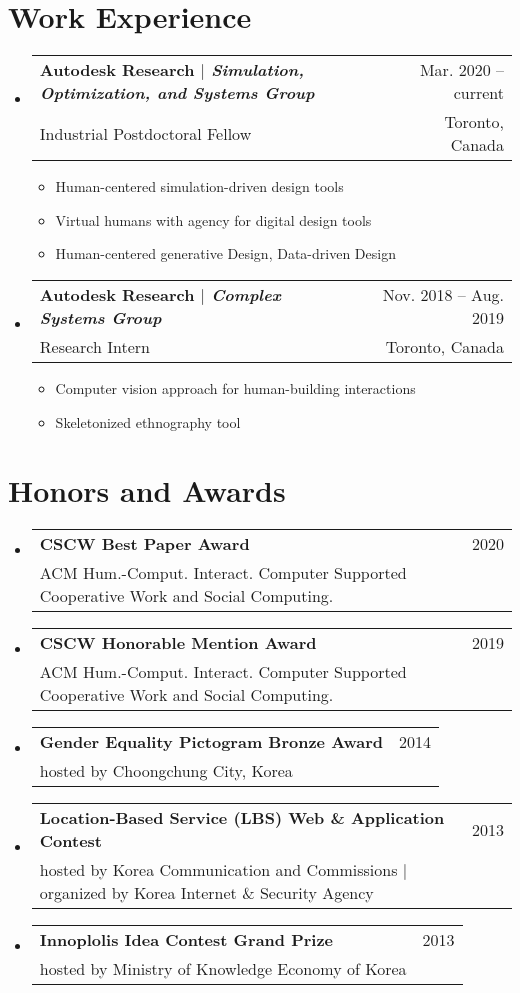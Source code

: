\documentclass[letterpaper,11pt]{article} %
\makeatletter
\newcommand{\CVItem}[1]{
  \item\small{
    {#1 \vspace{-2pt}}
  }
}
\newcommand{\CVSubheading}[4]{
  \vspace{-2pt}\item
    \begin{tabular*}{0.97\textwidth}[t]{l@{\extracolsep{\fill}}r}
      \textbf{#1} & #2 \\
      \small#3 & \small #4 \\
    \end{tabular*}\vspace{-7pt}
}
\newcommand{\CVSubHeadingListStart}{\begin{itemize}[leftmargin=0.5cm, label={}]}
\newcommand{\CVSubHeadingListEnd}{\end{itemize}}
\newcommand{\CVItemListStart}{\begin{itemize}}
\newcommand{\CVItemListEnd}{\end{itemize}\vspace{-5pt}}
\makeatother
\begin{document}
\begin{comment}
try to briefly explain what you did and why it is relevant to the position you are seeking
\end{comment}

\section{Work Experience}
  \CVSubHeadingListStart
    \CVSubheading
      {Autodesk Research $|$ \emph{\small{Simulation, Optimization, and Systems Group}}}{Mar. 2020 -- current}
      {Industrial Postdoctoral Fellow}{Toronto, Canada}
      \CVItemListStart
        \CVItem{Human-centered simulation-driven design tools}
        \CVItem{Virtual humans with agency for digital design tools}
        \CVItem{Human-centered generative Design, Data-driven Design}
        
    \CVItemListEnd
    
    \CVSubheading
      {Autodesk Research $|$ \emph{\small{Complex Systems Group}}}{Nov. 2018 -- Aug. 2019}
      {Research Intern}{Toronto, Canada}
      \CVItemListStart
        \CVItem{Computer vision approach for human-building interactions}
        \CVItem{Skeletonized ethnography tool}
      \CVItemListEnd
  \CVSubHeadingListEnd

\section{Honors and Awards}
  \CVSubHeadingListStart
    \CVSubheading
      {CSCW Best Paper Award}{2020}
      {ACM Hum.-Comput. Interact. Computer Supported Cooperative Work and Social Computing.}{}
    \CVSubheading
      {CSCW Honorable Mention Award}{2019}
      {ACM Hum.-Comput. Interact. Computer Supported Cooperative Work and Social Computing.}{}
    \CVSubheading
      {Gender Equality Pictogram Bronze Award}{2014}
      {hosted by Choongchung City, Korea}{}
    \CVSubheading
      {Location-Based Service (LBS) Web \& Application Contest}{2013}
      {hosted by Korea Communication and Commissions $|$ organized by Korea Internet \& Security Agency}{}
    \CVSubheading
      {Innoplolis Idea Contest Grand Prize}{2013}
      {hosted by Ministry of Knowledge Economy of Korea}{}
  \CVSubHeadingListEnd
  
\end{document}
